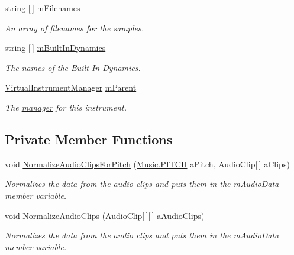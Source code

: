 \begin{DoxyCompactItemize}
string \mbox{[}$\,$\mbox{]} \hyperlink{group___v_i_base_pro_var_gab2add474ca506357688b5dd08cac4cb5}{m\+Filenames}
\begin{DoxyCompactList}\small\item\em An array of filenames for the samples. \end{DoxyCompactList}\item 
string \mbox{[}$\,$\mbox{]} \hyperlink{group___v_i_base_pro_var_ga87961e72f25fbc2256b614a394aa6f13}{m\+Built\+In\+Dynamics}
\begin{DoxyCompactList}\small\item\em The names of the \hyperlink{group___audio_DefBID}{Built-\/\+In Dynamics}. \end{DoxyCompactList}\item 
\hyperlink{class_virtual_instrument_manager}{Virtual\+Instrument\+Manager} \hyperlink{group___v_i_base_pro_var_gae4a87a656d9448cfea28215a6b9c3840}{m\+Parent}
\begin{DoxyCompactList}\small\item\em The \hyperlink{group___v_i_m}{manager} for this instrument. \end{DoxyCompactList}\end{DoxyCompactItemize}
\subsection*{Private Member Functions}
\begin{DoxyCompactItemize}
\item 
void \hyperlink{group___v_i_base_priv_func_gaecd4f9ead08a03be878b2085055a975c}{Normalize\+Audio\+Clips\+For\+Pitch} (\hyperlink{group___music_enums_ga508f69b199ea518f935486c990edac1d}{Music.\+P\+I\+T\+CH} a\+Pitch, Audio\+Clip\mbox{[}$\,$\mbox{]} a\+Clips)
\begin{DoxyCompactList}\small\item\em Normalizes the data from the audio clips and puts them in the m\+Audio\+Data member variable. \end{DoxyCompactList}\item 
void \hyperlink{group___v_i_base_priv_func_ga0262de8cfb1e671b01ba76de2e9d140a}{Normalize\+Audio\+Clips} (Audio\+Clip\mbox{[}$\,$\mbox{]}\mbox{[}$\,$\mbox{]} a\+Audio\+Clips)
\begin{DoxyCompactList}\small\item\em Normalizes the data from the audio clips and puts them in the m\+Audio\+Data member variable. \end{DoxyCompactList}\end{DoxyCompactItemize}
